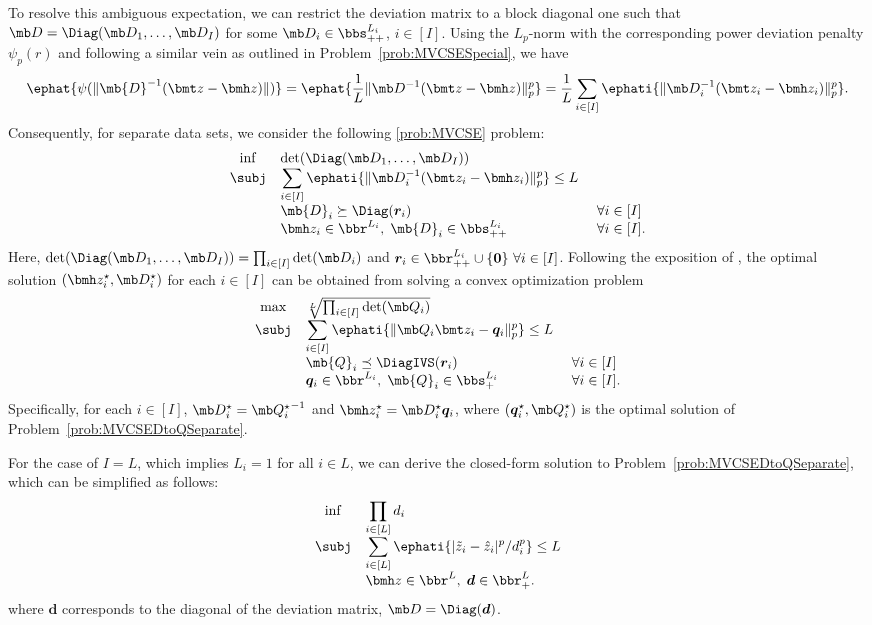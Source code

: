 \documentclass[mnsc, nonblindrev]{informswp}
\newcommand{\1}[1]{\mathds{1}{\left(#1\right)}}
\begin{document}
To resolve this ambiguous expectation, we can restrict the deviation matrix to a block diagonal one such that $\mb D = \Diag(\mb D_1,\dots, \mb D_I)$ for some $\mb D_i \in \bbs^{L_i}_{++}$, $i \in [I]$. Using the $L_p$-norm with the corresponding power deviation penalty $\psi_p(r)$ and following a similar vein as outlined in Problem~\eqref{prob:MVCSESpecial}, we have 
$$
\ephat{\psi(\|\mb{D}^{-1}(\bmt z - \bmh z)\|)} = \ephat{\frac{1}{L} \| \mb D^{-1}(\bmt z - \bmh z) \|^p_p} = \displaystyle  \frac{1}{L} \sum_{i \in [I]} \ephati{\| \mb D_i^{-1}(\bmt z_i - \bmh z_i) \|^p_p}.
$$
Consequently, for separate data sets, we consider the following \ref{prob:MVCSE} problem:
\[
\begin{array}{cll}
\inf & \det(\Diag(\mb D_1,\dots,\mb D_I)) \\
\subj & \displaystyle \sum_{i \in [I]} \ephati{\| \mb D_i^{-1}(\bmt z_i - \bmh z_i) \|^p_p}\leq L \\
& \mb{D}_i \succeq \Diag(\bm r_i) &~\forall i\in [I] \\
& \bmh z_i \in \bbr^{L_i}, \; \mb{D}_i \in \bbs^{L_i}_{++} &~\forall i \in [I].  
\end{array} 
\]
Here,
$\det(\Diag(\mb D_1,\dots,\mb D_I)) = \prod_{i \in [I]} \det(\mb D_i)$ and $\bm r_i \in \bbr^{L_i}_{++} \cup\{\bm 0\} ~ \forall i \in [I]$.
Following the exposition of , the  optimal solution $(\bmh z^\star_i, \mb D^\star_i)$ for each $i \in [I]$ can be obtained from solving a convex optimization problem
\begin{equation}
\label{prob:MVCSEDtoQSeparate}
\begin{array}{cll}
\max & \sqrt[L]{\prod_{i\in [I]} \det(\mb Q_i)} \\
\subj & \displaystyle \sum_{i \in [I]} \ephati{\| \mb Q_i\bmt z_i - \bm q_i \|^p_p}\leq L \\
& \mb{Q}_i \preceq \DiagIVS(\bm r_i) &~\forall i \in [I]\\
& \bm q_i \in \bbr^{L_i}, \; \mb{Q}_i \in \bbs^{L_i}_{+} &~\forall i \in [I].  
\end{array} 
\end{equation}
Specifically, for each $i \in [I]$, $\mb D_i^\star = {\mb Q^\star_i}^{-1}$ and $\bmh z^\star_i = \mb D^\star_i \bm q_i$, where $(\bm q^\star_i, \mb Q_i^\star)$ is the optimal solution of Problem~\eqref{prob:MVCSEDtoQSeparate}. 

For the case of $I=L$, which implies $L_i = 1$ for all $i \in L$, we can derive the closed-form solution to Problem~\eqref{prob:MVCSEDtoQSeparate}, which can be simplified as follows:
\begin{equation}
\label{prob:MVCSESpecialDiagonal}
\begin{array}{cll}
\inf & \displaystyle \prod_{i \in [L]}d_i \\
\subj & \displaystyle\sum_{i \in [L]}\ephati{|\tilde z_i - \hat z_i|^p/d^p_i} \leq L \\
& \bmh z \in \bbr^L, \; \bm  d \in \bbr^L_+.  
\end{array} 
\end{equation}
where $\bm d$ corresponds to  the diagonal of the deviation matrix, \ie $\mb D = \Diag(\bm d)$. 
\end{document}
